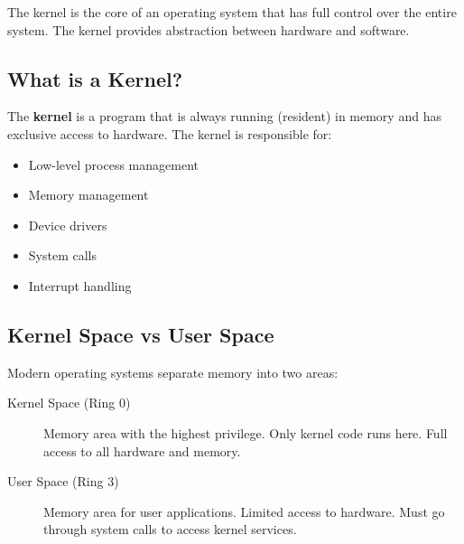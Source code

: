 The kernel is the core of an operating system that has full control over the entire system. The kernel provides abstraction between hardware and software.

\subsection{What is a Kernel?}

The \textbf{kernel} is a program that is always running (resident) in memory and has exclusive access to hardware. The kernel is responsible for:

\begin{itemize}
    \item Low-level process management
    \item Memory management
    \item Device drivers
    \item System calls
    \item Interrupt handling
\end{itemize}

\subsection{Kernel Space vs User Space}

Modern operating systems separate memory into two areas:

\begin{description}
    \item[Kernel Space (Ring 0)] Memory area with the highest privilege. Only kernel code runs here. Full access to all hardware and memory.

    \item[User Space (Ring 3)] Memory area for user applications. Limited access to hardware. Must go through system calls to access kernel services.
\end{description}

